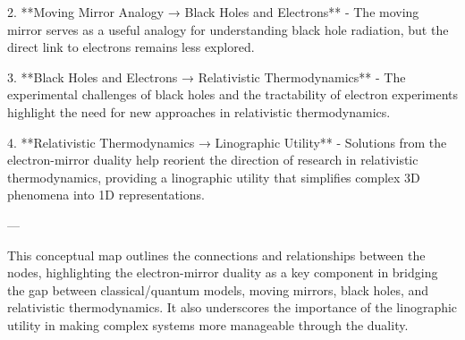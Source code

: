 2. **Moving Mirror Analogy → Black Holes and Electrons**
   - The moving mirror serves as a useful analogy for understanding black hole radiation, but the direct link to electrons remains less explored.

3. **Black Holes and Electrons → Relativistic Thermodynamics**
   - The experimental challenges of black holes and the tractability of electron experiments highlight the need for new approaches in relativistic thermodynamics.

4. **Relativistic Thermodynamics → Linographic Utility**
   - Solutions from the electron-mirror duality help reorient the direction of research in relativistic thermodynamics, providing a linographic utility that simplifies complex 3D phenomena into 1D representations.

---

This conceptual map outlines the connections and relationships between the nodes, highlighting the electron-mirror duality as a key component in bridging the gap between classical/quantum models, moving mirrors, black holes, and relativistic thermodynamics. It also underscores the importance of the linographic utility in making complex systems more manageable through the duality.